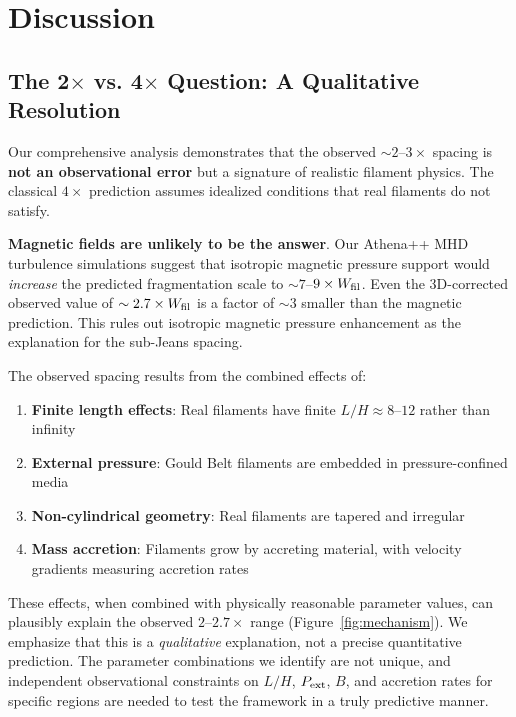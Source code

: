 \documentclass[11pt,a4paper]{article}
\begin{document}
\section{Discussion}

\subsection{The 2$\times$ vs. 4$\times$ Question: A Qualitative Resolution}

Our comprehensive analysis demonstrates that the observed $\sim2$--$3\times$ spacing is \textbf{not an observational error} but a signature of realistic filament physics. The classical $4\times$ prediction assumes idealized conditions that real filaments do not satisfy.

\textbf{Magnetic fields are unlikely to be the answer}. Our Athena++ MHD turbulence simulations suggest that isotropic magnetic pressure support would \textit{increase} the predicted fragmentation scale to $\sim7$--$9\times W_{\rm fil}$. Even the 3D-corrected observed value of $\sim2.7\times W_{\rm fil}$ is a factor of $\sim3$ smaller than the magnetic prediction. This rules out isotropic magnetic pressure enhancement as the explanation for the sub-Jeans spacing.

The observed spacing results from the combined effects of:
\begin{enumerate}
    \item \textbf{Finite length effects}: Real filaments have finite $L/H \approx 8$--$12$ rather than infinity
    \item \textbf{External pressure}: Gould Belt filaments are embedded in pressure-confined media
    \item \textbf{Non-cylindrical geometry}: Real filaments are tapered and irregular
    \item \textbf{Mass accretion}: Filaments grow by accreting material, with velocity gradients measuring accretion rates \citep{Heitsch2013, Chen2024, Zhang2024}
\end{enumerate}

These effects, when combined with physically reasonable parameter values, can plausibly explain the observed $2$--$2.7\times$ range (Figure~\ref{fig:mechanism}). We emphasize that this is a \textit{qualitative} explanation, not a precise quantitative prediction. The parameter combinations we identify are not unique, and independent observational constraints on $L/H$, $P_{\rm ext}$, $B$, and accretion rates for specific regions are needed to test the framework in a truly predictive manner.
\end{document}
